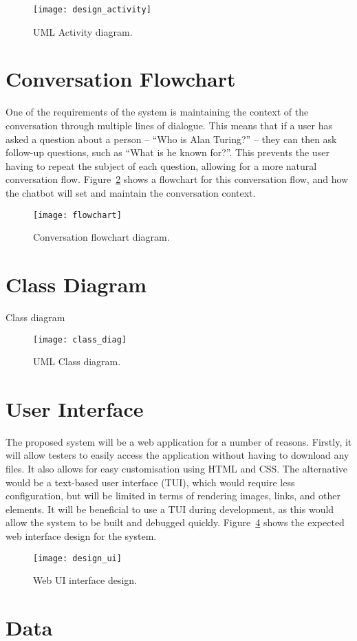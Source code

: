 \begin{figure}[h]
	\begin{center}
		\texttt{[image: design\_activity]}
	\end{center}
	\caption{UML Activity diagram.}
	\label{fig:design_activity}
\end{figure}

\section{Conversation Flowchart}
One of the requirements of the system is maintaining the context of the conversation through multiple lines of dialogue. This means that if a user has asked a question about a person -- ``Who is Alan Turing?'' -- they can then ask follow-up questions, such as ``What is he known for?''. This prevents the user having to repeat the subject of each question, allowing for a more natural conversation flow. Figure~\ref{fig:flowchart} shows a flowchart for this conversation flow, and how the chatbot will set and maintain the conversation context.

\begin{figure}[h]
	\begin{center}
		\texttt{[image: flowchart]}
	\end{center}
	\caption{Conversation flowchart diagram.}
	\label{fig:flowchart}
\end{figure}

\section{Class Diagram}
Class diagram
\begin{figure}[h]
	\begin{center}
		\texttt{[image: class\_diag]}
	\end{center}
	\caption{UML Class diagram.}
	\label{fig:class_diagram}
\end{figure}

\newpage
\section{User Interface}
The proposed system will be a web application for a number of reasons. Firstly, it will allow testers to easily access the application without having to download any files. It also allows for easy customisation using HTML and CSS. The alternative would be a text-based user interface (TUI), which would require less configuration, but will be limited in terms of rendering images, links, and other elements. It will be beneficial to use a TUI during development, as this would allow the system to be built and debugged quickly. Figure~\ref{fig:design_ui} shows the expected web interface design for the system.

\begin{figure}[h]
	\begin{center}
		\texttt{[image: design\_ui]}
	\end{center}
	\caption{Web UI interface design.}
	\label{fig:design_ui}
\end{figure}

\section{Data}
